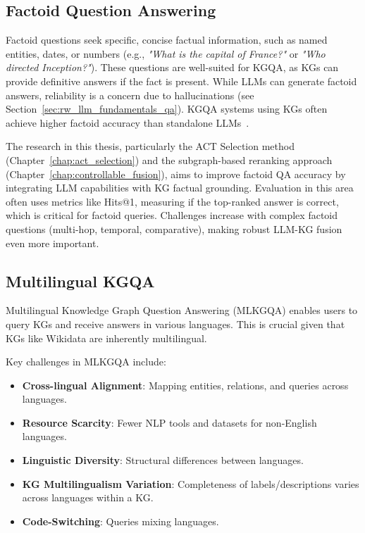 \subsection{Factoid Question Answering}
Factoid questions seek specific, concise factual information, such as named entities, dates, or numbers (e.g., \textit{"What is the capital of France?"} or \textit{"Who directed Inception?"}). These questions are well-suited for KGQA, as KGs can provide definitive answers if the fact is present. While LLMs can generate factoid answers, reliability is a concern due to hallucinations (see Section~\ref{sec:rw_llm_fundamentals_qa}). KGQA systems using KGs often achieve higher factoid accuracy than standalone LLMs~\cite{DBLP:conf/emnlp/GuptaC018}.

The research in this thesis, particularly the ACT Selection method (Chapter~\ref{chap:act_selection}) and the subgraph-based reranking approach (Chapter~\ref{chap:controllable_fusion}), aims to improve factoid QA accuracy by integrating LLM capabilities with KG factual grounding. Evaluation in this area often uses metrics like Hits@1, measuring if the top-ranked answer is correct, which is critical for factoid queries. Challenges increase with complex factoid questions (multi-hop, temporal, comparative), making robust LLM-KG fusion even more important.

\subsection{Multilingual KGQA}
Multilingual Knowledge Graph Question Answering (MLKGQA) enables users to query KGs and receive answers in various languages. This is crucial given that KGs like Wikidata are inherently multilingual.

Key challenges in MLKGQA include:
\begin{itemize}
    \item \textbf{Cross-lingual Alignment}: Mapping entities, relations, and queries across languages.
    \item \textbf{Resource Scarcity}: Fewer NLP tools and datasets for non-English languages.
    \item \textbf{Linguistic Diversity}: Structural differences between languages.
    \item \textbf{KG Multilingualism Variation}: Completeness of labels/descriptions varies across languages within a KG.
    \item \textbf{Code-Switching}: Queries mixing languages.
\end{itemize}

